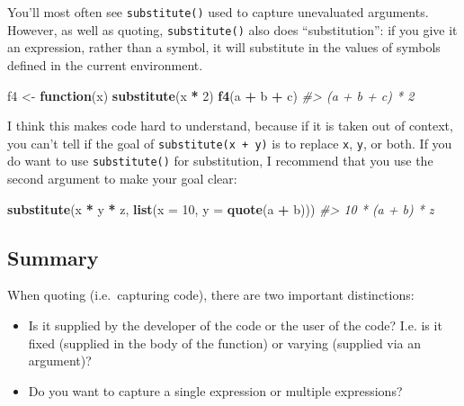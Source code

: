 \documentclass[]{book}
\makeatletter
\newenvironment{Shaded}{\begin{snugshade}}{\end{snugshade}}
\newcommand{\CommentTok}[1]{\textcolor[rgb]{0.37,0.37,0.37}{\textit{#1}}}
\newcommand{\ControlFlowTok}[1]{\textcolor[rgb]{0.27,0.27,0.27}{\textbf{#1}}}
\newcommand{\DataTypeTok}[1]{\textcolor[rgb]{0.27,0.27,0.27}{#1}}
\newcommand{\DecValTok}[1]{\textcolor[rgb]{0.06,0.06,0.06}{#1}}
\newcommand{\KeywordTok}[1]{\textcolor[rgb]{0.27,0.27,0.27}{\textbf{#1}}}
\newcommand{\NormalTok}[1]{#1}
\newcommand{\OperatorTok}[1]{\textcolor[rgb]{0.43,0.43,0.43}{\textbf{#1}}}
\newcommand{\StringTok}[1]{\textcolor[rgb]{0.5,0.5,0.5}{#1}}
\newcommand{\indexc}[1]{\index{#1@\texttt{#1}}}
\makeatother
\begin{document}
\indexc{substitute()}

You'll most often see \texttt{substitute()} used to capture unevaluated arguments. However, as well as quoting, \texttt{substitute()} also does ``substitution'': if you give it an expression, rather than a symbol, it will substitute in the values of symbols defined in the current environment.

\begin{Shaded}
\begin{Highlighting}[]
\NormalTok{f4 <-}\StringTok{ }\ControlFlowTok{function}\NormalTok{(x) }\KeywordTok{substitute}\NormalTok{(x }\OperatorTok{*}\StringTok{ }\DecValTok{2}\NormalTok{)}
\KeywordTok{f4}\NormalTok{(a }\OperatorTok{+}\StringTok{ }\NormalTok{b }\OperatorTok{+}\StringTok{ }\NormalTok{c)}
\CommentTok{#> (a + b + c) * 2}
\end{Highlighting}
\end{Shaded}

I think this makes code hard to understand, because if it is taken out of context, you can't tell if the goal of \texttt{substitute(x\ +\ y)} is to replace \texttt{x}, \texttt{y}, or both. If you do want to use \texttt{substitute()} for substitution, I recommend that you use the second argument to make your goal clear:

\begin{Shaded}
\begin{Highlighting}[]
\KeywordTok{substitute}\NormalTok{(x }\OperatorTok{*}\StringTok{ }\NormalTok{y }\OperatorTok{*}\StringTok{ }\NormalTok{z, }\KeywordTok{list}\NormalTok{(}\DataTypeTok{x =} \DecValTok{10}\NormalTok{, }\DataTypeTok{y =} \KeywordTok{quote}\NormalTok{(a }\OperatorTok{+}\StringTok{ }\NormalTok{b)))}
\CommentTok{#> 10 * (a + b) * z}
\end{Highlighting}
\end{Shaded}

\hypertarget{summary-1}{%
\subsection{Summary}\label{summary-1}}

When quoting (i.e.~capturing code), there are two important distinctions:

\begin{itemize}
\item
  Is it supplied by the developer of the code or the user of the code?
  I.e. is it fixed (supplied in the body of the function) or varying (supplied
  via an argument)?
\item
  Do you want to capture a single expression or multiple expressions?
\end{itemize}
\end{document}
